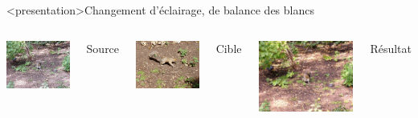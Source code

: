 \begin{frame}<presentation>{Changement d'éclairage, de balance des blancs}
  \begin{columns}
    \column{6cm}
    \centering
    \includegraphics[width=4cm]{p7250101}

    Source

    \vspace{2ex}
    \includegraphics[width=4cm]{p7250102}

    Cible

    \column{6cm}
    \centering
    \includegraphics[width=6cm]{srcp7250101tgtp7250102}

    Résultat
  \end{columns}
\end{frame}

